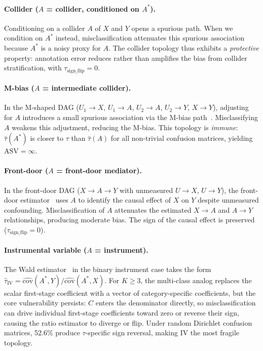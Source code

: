 \paragraph{Collider ($A$ = collider, conditioned on $A^*$).}
Conditioning on a collider $A$ of $X$ and $Y$ opens a spurious path. When we condition on $A^*$ instead, misclassification attenuates this spurious association because $A^*$ is a noisy proxy for $A$. The collider topology thus exhibits a \emph{protective} property: annotation error reduces rather than amplifies the bias from collider stratification, with $\tau_{\text{sign\_flip}} = 0$.

\paragraph{M-bias ($A$ = intermediate collider).}
In the M-shaped DAG ($U_1 \to X$, $U_1 \to A$, $U_2 \to A$, $U_2 \to Y$, $X \to Y$), adjusting for $A$ introduces a small spurious association via the M-bias path~\cite{greenland2003}. Misclassifying $A$ weakens this adjustment, reducing the M-bias. This topology is \emph{immune}: $\hat{\tau}(A^*)$ is closer to $\tau$ than $\hat{\tau}(A)$ for all non-trivial confusion matrices, yielding $\text{ASV} = \infty$.

\paragraph{Front-door ($A$ = front-door mediator).}
In the front-door DAG ($X \to A \to Y$ with unmeasured $U \to X$, $U \to Y$), the front-door estimator~\cite{bellemare_bloem2024} uses $A$ to identify the causal effect of $X$ on $Y$ despite unmeasured confounding. Misclassification of $A$ attenuates the estimated $X \to A$ and $A \to Y$ relationships, producing moderate bias. The sign of the causal effect is preserved ($\tau_{\text{sign\_flip}} = 0$).

\paragraph{Instrumental variable ($A$ = instrument).}
The Wald estimator~\cite{angrist_imbens1995} in the binary instrument case takes the form $\hat{\tau}_{\text{IV}} = \hat{\text{cov}}(A^*, Y) / \hat{\text{cov}}(A^*, X)$. For $K{\geq}3$, the multi-class analog replaces the scalar first-stage coefficient with a vector of category-specific coefficients, but the core vulnerability persists: $C$ enters the denominator directly, so misclassification can drive individual first-stage coefficients toward zero or reverse their sign, causing the ratio estimator to diverge or flip. Under random Dirichlet confusion matrices, 52.6\% produce $\tau$-specific sign reversal, making IV the most fragile topology.

